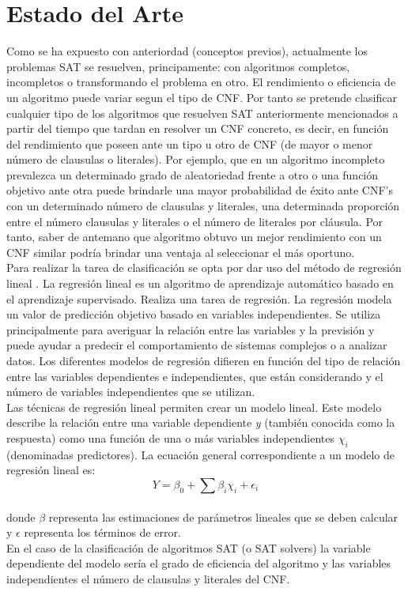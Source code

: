 \documentclass[11pt]{article}
\begin{document}
	\section{Estado del Arte}
		Como se ha expuesto con anteriordad (conceptos previos), actualmente los problemas SAT se resuelven, principamente: con algoritmos completos, incompletos o transformando el problema en otro.
		El rendimiento o eficiencia de un algoritmo puede variar segun el tipo de CNF. Por tanto se pretende clasificar cualquier tipo de los algoritmos que resuelven SAT anteriormente
		mencionados a partir del tiempo que tardan en resolver un CNF concreto, es decir, en función del rendimiento
		que poseen ante un tipo u otro de CNF (de mayor o menor número de clausulas o literales).
		Por ejemplo, que en un algoritmo incompleto prevalezca un determinado grado de aleatoriedad frente a otro o una función objetivo ante otra 
		puede brindarle una mayor probabilidad de éxito ante CNF's con un determinado número de clausulas y literales, una determinada proporción entre el número clausulas y literales o el número
		de literales por cláusula. Por tanto, saber de antemano que algoritmo obtuvo un mejor rendimiento con un CNF similar podría brindar una ventaja al seleccionar 
		el más oportuno. \\
		
		Para realizar la tarea de clasificación se opta por dar uso del método de regresión lineal \cite{linear_regression}.
		La regresión lineal es un algoritmo de aprendizaje automático basado en el aprendizaje supervisado. 
		Realiza una tarea de regresión. La regresión modela un valor de predicción objetivo basado en variables independientes. 
		Se utiliza principalmente para averiguar la relación entre las variables y la previsión y puede ayudar a predecir el comportamiento de sistemas complejos o a analizar datos.
		Los diferentes modelos de regresión difieren en función del tipo de relación entre las variables dependientes e independientes, 
		que están considerando y el número de variables independientes que se utilizan. \\

		Las técnicas de regresión lineal permiten crear un modelo lineal. Este modelo describe la relación entre una variable dependiente \textit{y} (también conocida como la respuesta) 
		como una función de una o más variables independientes \(\chi_i\) (denominadas predictores). La ecuación general correspondiente a un modelo de regresión lineal es:
		\begin{equation}
			Y = \beta_0 + \sum \beta_i \chi_i + \epsilon_i
		\end{equation} \\
		donde \(\beta\) representa las estimaciones de parámetros lineales que se deben calcular y \(\epsilon\) representa los términos de error. \\
		En el caso de la clasificación de algoritmos SAT (o SAT solvers) la variable dependiente del modelo sería el grado de eficiencia del algoritmo y las variables independientes el número de 
		clausulas y literales del CNF. \\
\end{document}
